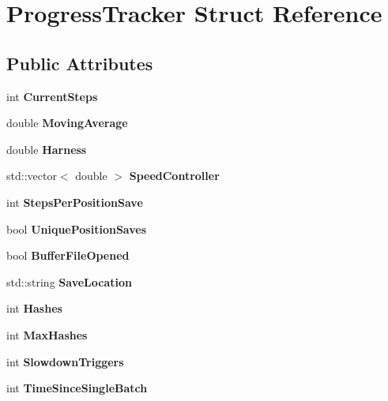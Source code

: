 \hypertarget{structProgressTracker}{}\section{Progress\+Tracker Struct Reference}
\label{structProgressTracker}
\subsection*{Public Attributes}
\begin{DoxyCompactItemize}
\item 
\mbox{\label{structProgressTracker_aa531f094e8ad975dfefc47ece359592d}} 
int {\bfseries Current\+Steps}
\item 
\mbox{\label{structProgressTracker_a6dfeb8637c85c7310af398578d221bac}} 
double {\bfseries Moving\+Average}
\item 
\mbox{\label{structProgressTracker_ae1c6ce39fe19ccf2d99e04d84bf8c52f}} 
double {\bfseries Harness}
\item 
\mbox{\label{structProgressTracker_a278dfc52759a8b774b7df65ddd474cbb}} 
std\+::vector$<$ double $>$ {\bfseries Speed\+Controller}
\item 
\mbox{\label{structProgressTracker_a972f79a55a785d579031f956e52f92e8}} 
int {\bfseries Steps\+Per\+Position\+Save}
\item 
\mbox{\label{structProgressTracker_a42a1492c36b842d23968e36c01b58b91}} 
bool {\bfseries Unique\+Position\+Saves}
\item 
\mbox{\label{structProgressTracker_a89936bd25d378bb4c90fa278ce7cc373}} 
bool {\bfseries Buffer\+File\+Opened}
\item 
\mbox{\label{structProgressTracker_a1f87aa774affb12847fdf90e912ac147}} 
std\+::string {\bfseries Save\+Location}
\item 
\mbox{\label{structProgressTracker_a5b3ece79bcfab593be27396d393f6370}} 
int {\bfseries Hashes}
\item 
\mbox{\label{structProgressTracker_ad0995169886380eae9bed1c416e20fe7}} 
int {\bfseries Max\+Hashes}
\item 
\mbox{\label{structProgressTracker_aa9e165a0b18af7d137a7b7bacf7e43bd}} 
int {\bfseries Slowdown\+Triggers}
\item 
\mbox{\label{structProgressTracker_aa9d40fe1375a0e92aa429b8b1bf40ee6}} 
int {\bfseries Time\+Since\+Single\+Batch}
\end{DoxyCompactItemize}


